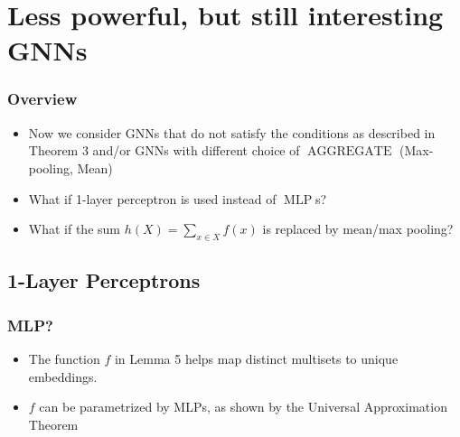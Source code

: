 \documentclass[handout]{beamer}
\DeclareMathOperator{\aggregate}{AGGREGATE}
\DeclareMathOperator{\mlp}{MLP}
\begin{document}

\section{Less powerful, but still interesting GNNs}

\begin{frame}
\frametitle{Overview}

\begin{itemize}
	\item Now we consider GNNs that do not satisfy the conditions as described in Theorem 3 and/or GNNs with different choice of $\aggregate$ (Max-pooling, Mean) \pause
	
	\item What if 1-layer perceptron is used instead of $\mlp$s? \pause
	
	\item What if the sum $h(X) = \sum_{x \in X} f(x)$ is replaced by mean/max pooling?
	
\end{itemize}
\end{frame}


\subsection{1-Layer Perceptrons}

\begin{frame}
\frametitle{MLP?}

\begin{itemize}
	\item The function $f$ in Lemma 5 helps map distinct multisets to unique embeddings. \pause
	
	\item $f$ can be parametrized by MLPs, as shown by the Universal Approximation Theorem
	
\end{itemize}

\end{frame}

\end{document}
